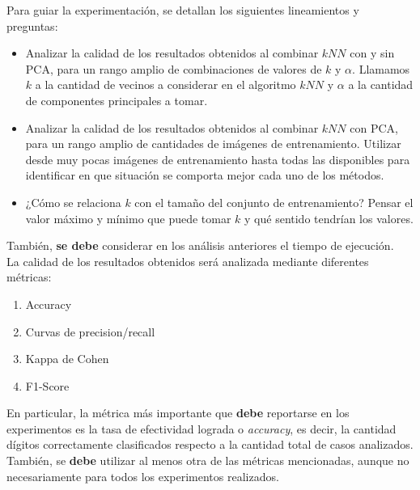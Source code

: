 \documentclass[11pt, a4paper]{article}
\newcommand{\kknn}{k}
\newcommand{\kpca}{\alpha}
\begin{document}
Para guiar la experimentación, se detallan los siguientes lineamientos y preguntas:
%
\begin{itemize}
  \item Analizar la calidad de los resultados obtenidos al combinar $kNN$ con y sin PCA, para un rango amplio de combinaciones de valores de $\kknn$ y $\kpca$. 
  Llamamos $\kknn$ a la cantidad de vecinos a considerar en el algoritmo $kNN$ y $\kpca$ a la cantidad de componentes principales a tomar.
  \item Analizar la calidad de los resultados obtenidos al combinar $kNN$ con PCA, para un rango amplio de cantidades de imágenes de entrenamiento. Utilizar desde muy pocas imágenes de entrenamiento hasta todas las disponibles para identificar en que situación se comporta mejor cada uno de los métodos.
  \item ¿Cómo se relaciona $\kknn$ con el tamaño del conjunto de entrenamiento? Pensar el valor máximo y mínimo que puede tomar $\kknn$ y qué sentido tendrían los valores.

\end{itemize}
%
También, \textbf{se debe} considerar en los análisis anteriores el tiempo de ejecución.\\

La calidad de los resultados obtenidos será analizada mediante diferentes métricas:
%
\begin{enumerate}
 \item Accuracy
 \item Curvas de precision/recall
 \item {Kappa de Cohen}
 \item {F1-Score}
\end{enumerate}
En particular, la métrica más importante que \textbf{debe} reportarse en los experimentos es la tasa de efectividad lograda o \textit{accuracy}, es decir, la cantidad dígitos correctamente clasificados respecto a la cantidad total de casos analizados.
%
También, se \textbf{debe} utilizar al menos otra de las métricas mencionadas, aunque no necesariamente para todos los experimentos realizados.
\end{document}
